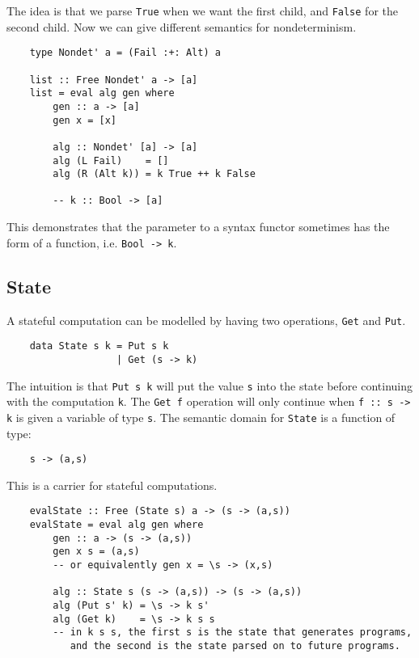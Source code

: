 \documentclass[a4paper,12pt]{article}
\theoremstyle{remark}
\begin{document}
The idea is that we parse \lstinline{True} when we want the first child, and \lstinline{False}
for the second child. Now we can give different semantics for nondeterminism.

\begin{lstlisting}
    type Nondet' a = (Fail :+: Alt) a

    list :: Free Nondet' a -> [a]
    list = eval alg gen where
        gen :: a -> [a]
        gen x = [x]

        alg :: Nondet' [a] -> [a]
        alg (L Fail)    = []
        alg (R (Alt k)) = k True ++ k False

        -- k :: Bool -> [a]  \end{lstlisting}

This demonstrates that the parameter to a syntax functor sometimes has the form of a
function, i.e. \lstinline{Bool -> k}.

\subsection{State}

A stateful computation can be modelled by having two operations, \lstinline{Get}
and \lstinline{Put}.

\begin{lstlisting}
    data State s k = Put s k
                   | Get (s -> k)  \end{lstlisting}

The intuition is that \lstinline{Put s k} will put the value \lstinline{s} into the
state before continuing with the computation \lstinline{k}. The \lstinline{Get f}
operation will only continue when \lstinline{f :: s -> k} is given a variable of type
\lstinline{s}. The semantic domain for \lstinline{State} is a function of type:

\begin{lstlisting}
    s -> (a,s)  \end{lstlisting}

This is a carrier for stateful computations.

\begin{lstlisting}
    evalState :: Free (State s) a -> (s -> (a,s))
    evalState = eval alg gen where
        gen :: a -> (s -> (a,s))
        gen x s = (a,s)
        -- or equivalently gen x = \s -> (x,s)

        alg :: State s (s -> (a,s)) -> (s -> (a,s))
        alg (Put s' k) = \s -> k s'
        alg (Get k)    = \s -> k s s
        -- in k s s, the first s is the state that generates programs,
           and the second is the state parsed on to future programs.  \end{lstlisting}
\end{document}

